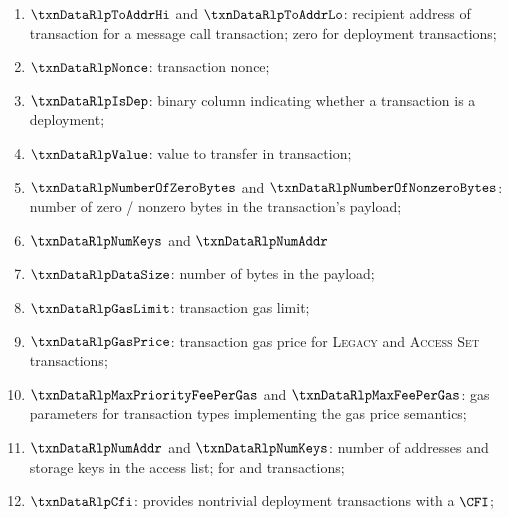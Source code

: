 \begin{enumerate}[resume]
	\item
		$\txnDataRlpToAddrHi$ and
		$\txnDataRlpToAddrLo$:
		recipient address of transaction for a message call transaction;
		zero for deployment transactions;
	\item
		$\txnDataRlpNonce$:
		transaction nonce;
	\item
		$\txnDataRlpIsDep$:
		binary column indicating whether a transaction is a deployment;
	\item
		$\txnDataRlpValue$:
		value to transfer in transaction;
	\item
		$\txnDataRlpNumberOfZeroBytes$ and
		$\txnDataRlpNumberOfNonzeroBytes$:
		number of zero / nonzero bytes in the transaction's payload;
	\item
		$\txnDataRlpNumKeys$ and
		$\txnDataRlpNumAddr$
	\item
		$\txnDataRlpDataSize$:
		number of bytes in the payload;
	\item
		$\txnDataRlpGasLimit$:
		transaction gas limit;
	\item
		$\txnDataRlpGasPrice$:
		transaction gas price for
		\textsc{Legacy} and
		\textsc{Access Set} transactions;
	\item
		$\txnDataRlpMaxPriorityFeePerGas $ and
		$\txnDataRlpMaxFeePerGas         $:
		gas parameters for transaction types implementing the
		\cite{EIP-1559} gas price semantics;
	\item
		$\txnDataRlpNumAddr$ and
		$\txnDataRlpNumKeys$:
		number of addresses and storage keys in the access list;
		for \cite{EIP-2929} and \cite{EIP-2930} transactions;
	\item
		$\txnDataRlpCfi$:
		provides nontrivial deployment transactions with a $\CFI$;
\end{enumerate}
